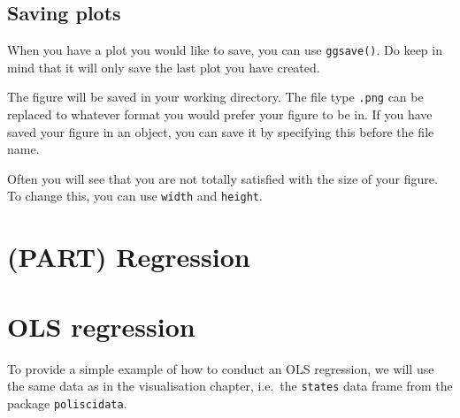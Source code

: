 \documentclass[12pt,oneside]{reedthesis}
\theoremstyle{definition}
\theoremstyle{definition}
\theoremstyle{definition}
\theoremstyle{remark}
\begin{document}
  \section{Saving plots}\label{saving-plots}
  
  When you have a plot you would like to save, you can use
  \texttt{ggsave()}. Do keep in mind that it will only save the last plot
  you have created.
  \begin{Shaded}
  \begin{Highlighting}[]
  \NormalTok{(}\NormalTok{)}
  \end{Highlighting}
  \end{Shaded}
  The figure will be saved in your working directory. The file type
  \texttt{.png} can be replaced to whatever format you would prefer your
  figure to be in. If you have saved your figure in an object, you can
  save it by specifying this before the file name.
  \begin{Shaded}
  \begin{Highlighting}[]
  \NormalTok{)}
  \end{Highlighting}
  \end{Shaded}
  Often you will see that you are not totally satisfied with the size of
  your figure. To change this, you can use \texttt{width} and
  \texttt{height}.
  \begin{Shaded}
  \begin{Highlighting}[]
  \NormalTok{, } \NormalTok{, } \NormalTok{)}
  \end{Highlighting}
  \end{Shaded}
  \chapter*{(PART) Regression}\label{part-regression}
  
  \chapter{OLS regression}\label{olsreg}
  
  To provide a simple example of how to conduct an OLS regression, we will
  use the same data as in the visualisation chapter, i.e.~the
  \texttt{states} data frame from the package \texttt{poliscidata}.
  \begin{Shaded}
  \begin{Highlighting}[]
  \NormalTok{(}\NormalTok{)}
  
  \StringTok{ }
  \end{Highlighting}
  \end{Shaded}
\end{document}

